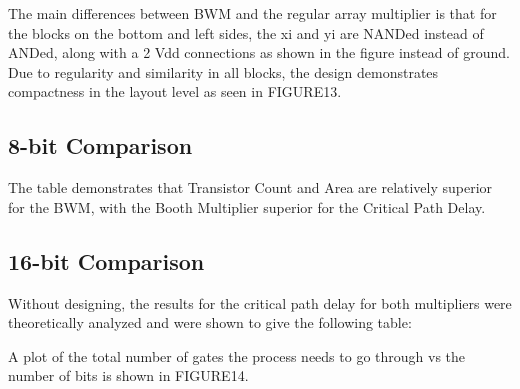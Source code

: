 \documentclass[conference]{IEEEtran}
\begin{document}
The main differences between BWM and the regular array multiplier is that for the blocks on the bottom and left sides, the xi and yi are NANDed instead of ANDed, along with a 2 Vdd connections as shown in the figure instead of ground. Due to regularity and similarity in all blocks, the design demonstrates compactness in the layout level as seen in FIGURE13.


\subsection{8-bit Comparison}

The table demonstrates that Transistor Count and Area are relatively superior for the BWM, with the Booth Multiplier superior for the Critical Path Delay.


\subsection{16-bit Comparison}

Without designing, the results for the critical path delay for both multipliers were theoretically analyzed and were shown to give the following table:


A plot of the total number of gates the process needs to go through vs the number of bits is shown in FIGURE14.





\end{document}

